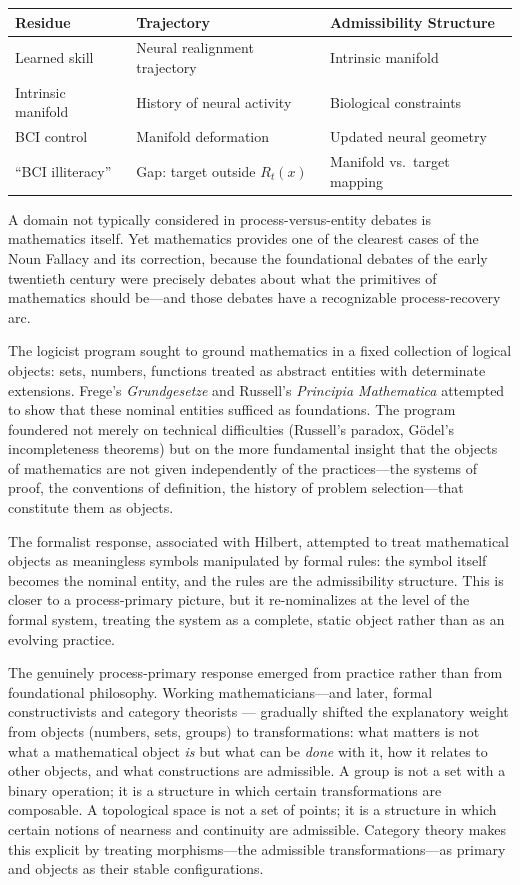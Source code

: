 \documentclass[12pt, a4paper]{article}
\theoremstyle{plain}
\theoremstyle{definition}
\theoremstyle{remark}
\begin{document}
\begin{center}
\begin{tabular}{lll}
\toprule
\textbf{Residue} & \textbf{Trajectory} & \textbf{Admissibility Structure} \\
\midrule
Learned skill & Neural realignment trajectory & Intrinsic manifold \\
Intrinsic manifold & History of neural activity & Biological constraints \\
BCI control & Manifold deformation & Updated neural geometry \\
``BCI illiteracy'' & Gap: target outside $R_t(x)$ & Manifold vs.\ target mapping \\
\bottomrule
\end{tabular}
\end{center}

A domain not typically considered in process-versus-entity debates is
mathematics itself. Yet mathematics provides one of the clearest cases of
the Noun Fallacy and its correction, because the foundational debates of the
early twentieth century were precisely debates about what the primitives of
mathematics should be---and those debates have a recognizable process-recovery
arc.

The logicist program sought to ground mathematics in a fixed collection of
logical objects: sets, numbers, functions treated as abstract entities with
determinate extensions. Frege's \emph{Grundgesetze} and Russell's
\emph{Principia Mathematica} attempted to show that these nominal entities
sufficed as foundations. The program foundered not merely on technical
difficulties (Russell's paradox, Gödel's incompleteness theorems) but on
the more fundamental insight that the objects of mathematics are not given
independently of the practices---the systems of proof, the conventions of
definition, the history of problem selection---that constitute them as objects.

The formalist response, associated with Hilbert, attempted to treat mathematical
objects as meaningless symbols manipulated by formal rules: the symbol itself
becomes the nominal entity, and the rules are the admissibility structure.
This is closer to a process-primary picture, but it re-nominalizes at the
level of the formal system, treating the system as a complete, static object
rather than as an evolving practice.

The genuinely process-primary response emerged from practice rather than from
foundational philosophy. Working mathematicians---and later, formal
constructivists \citep{bishop1967} and category theorists \citep{lawvere1969}---
gradually shifted the explanatory weight from objects (numbers, sets, groups)
to transformations: what matters is not what a mathematical object \emph{is}
but what can be \emph{done} with it, how it relates to other objects, and what
constructions are admissible. A group is not a set with a binary operation;
it is a structure in which certain transformations are composable. A topological
space is not a set of points; it is a structure in which certain notions of
nearness and continuity are admissible. Category theory makes this explicit by
treating morphisms---the admissible transformations---as primary and objects
as their stable configurations.
\end{document}
